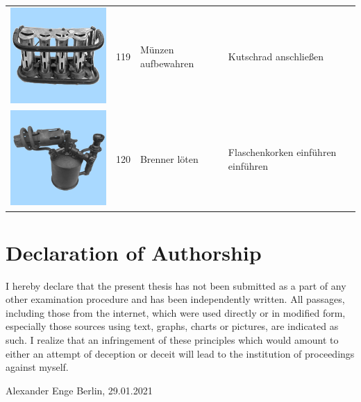 \documentclass[
  english,
  doc,12pt,twoside,floatsintext]{apa7}
\begin{document}
\begin{center}
\begin{ThreePartTable}
\begin{longtable}{llll}
\includegraphics[valign=c, scale=0.19]{../materials/unfamiliar/119.png} & 119 & Münzen aufbewahren & Kutschrad anschließen\\
\includegraphics[valign=c, scale=0.19]{../materials/unfamiliar/120.png} & 120 & Brenner löten & Flaschenkorken einführen einführen\\
\bottomrule
\end{longtable}

\end{ThreePartTable}
\end{center}

\newpage
\setlength{\parindent}{0.5in}

\hypertarget{declaration-of-authorship}{%
\section*{Declaration of Authorship}\label{declaration-of-authorship}}

I hereby declare that the present thesis has not been submitted as a part of any other examination procedure and has been independently written. All passages, including those from the internet, which were used directly or in modified form, especially those sources using text, graphs, charts or pictures, are indicated as such. I realize that an infringement of these principles which would amount to either an attempt of deception or deceit will lead to the institution of proceedings against myself.

\vspace*{20mm}

\noindent
Alexander Enge\newline
Berlin, 29.01.2021

\clearpage

\mbox{}\thispagestyle{empty}\clearpage
\end{document}
